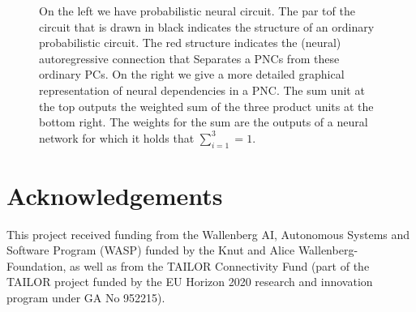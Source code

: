 \documentclass[
]{ceurart}
\newcommand{\midlinewidth}{1.0pt}
\begin{document}
\begin{figure}[t]
\begin{minipage}[c]{0.49\linewidth}
{
		}
	\end{minipage}


	\caption{
		On the left we have probabilistic neural circuit. The par tof the circuit that is drawn in black indicates the structure of an ordinary probabilistic circuit.
		The red structure indicates the (neural) autoregressive connection that Separates a PNCs from these ordinary PCs.
		On the right we give a more detailed graphical representation of neural dependencies in a PNC. The sum unit at the top outputs the weighted sum of the three product units at the bottom right. The weights for the sum are the outputs of a neural network for which it holds that $\sum_{i=1}^3=1$.
	}

	\label{fig:partition_graph}
\end{figure}






















\section*{Acknowledgements}

This project received funding from the Wallenberg AI, Autonomous Systems and Software Program (WASP) funded by the Knut and Alice Wallenberg-Foundation, as well as from the TAILOR Connectivity Fund (part of the TAILOR project funded by the EU Horizon 2020 research and innovation program under GA No 952215).




\end{document}
